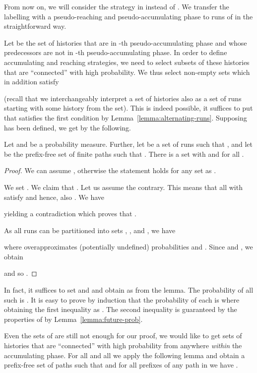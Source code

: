 \documentclass[a4paper,UKenglish]{lipics}
\begin{document}
From now on, we will consider the strategy  in  instead of . We transfer the labelling with a pseudo-reaching and pseudo-accumulating phase to runs of  in the straightforward way.


Let  be the set of histories that are in -th pseudo-accumulating phase and whose predecessors are not in -th pseudo-accumulating phase.
In order to define accumulating and reaching strategies, we need to select subsets of these histories that are ``connected'' with high probability.
We thus select non-empty sets  which in addition satisfy 

(recall that we interchangeably interpret a set of histories also as a set of runs starting with some history from the set).
This is indeed possible, it suffices to put  that satisfies the first condition by Lemma~\ref{lemma:alternating-runs}. Supposing  has been defined, we get  by the following.

\begin{lemma}\label{lemma:future-prob}
Let  and  be a probability measure. Further, let  be a set of runs such that , and let  be the prefix-free set of finite paths such that . There is a set  with 
	and  for all .
\end{lemma}
\begin{proof}
	We can assume , otherwise the statement holds for any set  as .
	
	We set . We claim that . Let us assume the contrary. This means that all  with  satisfy  and hence, also . We have 
	
	yielding a contradiction which proves that .



	As all runs can be partitioned into sets , , and , we have
	
	where  overapproximates (potentially undefined) probabilities  and .
	Since  and , we obtain
	
	and so .
\end{proof}

\noindent
In fact, it suffices to set  and  and obtain  as  from the lemma. The probability of all such  is . It is easy to prove by induction that the probability of each  is  where  obtaining the first inequality as . The second inequality is guaranteed by the properties of  by Lemma~\ref{lemma:future-prob}.

Even the sets of  are still not enough for our proof, we would like to get sets of histories that are ``connected'' with high probability from anywhere \emph{within} the accumulating phase.
For all  and all  we apply the following lemma and obtain a prefix-free set of paths  such that
 and for all prefixes  of any path in  we have .
\end{document}
